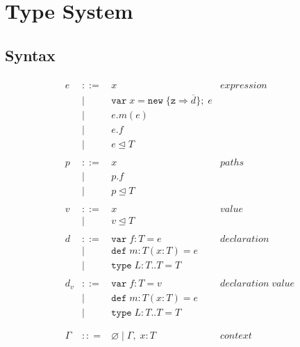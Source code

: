 \documentclass{llncs}
\begin{document}
\section{Type System}
	\label{s:type_sys}


\subsection{Syntax}


\begin{figure}[h]
\[
\begin{array}{lll}
\begin{array}{lllr}
e & ::= & x & expression \\
& | & \texttt{var} \; x = \texttt{new} \; \{\texttt{z} \Rightarrow \overline{d}\}; \; e&\\
& | & e.m(e) &\\
& | & e.f &\\
& | & e \unlhd T&\\
&&\\
p & ::= & x & paths \\
& | & p.f &\\
& | & p \unlhd T &\\
&&\\
v & ::= & x & value \\
& | & v \unlhd T &\\
&&\\
d & ::= & \texttt{var} \; f : T = e & declaration \\
  & |   & \texttt{def} \; m : T(x:T) = e &\\
  & |   & \texttt{type} \; L : T .. T = T &\\
&&\\
d_v & ::= & \texttt{var} \; f : T = v & declaration \; value \\
  & |   & \texttt{def} \; m : T(x:T) = e &\\
  & |   & \texttt{type} \; L : T .. T = T &\\
&&\\
&&\\
\Gamma & :: = & \varnothing \; | \; \Gamma, \; x : T & context \\
&&\\

\end{array}
\end{array}\]
\end{figure}
\end{document}
